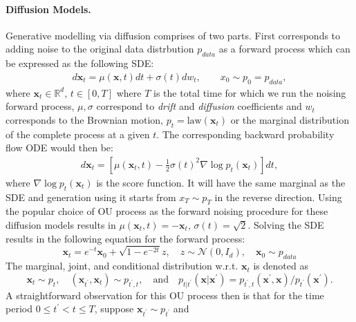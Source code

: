 \documentclass[11pt]{article}
\newcommand{\xh}[1]{\textcolor[HTML]{66CCFF}{#1}}
\def\rvx{{\mathbf{x}}}
\def\vx{{\bm{x}}}
\begin{document}
\paragraph{Diffusion Models.} Generative modelling via diffusion comprises of two parts. First corresponds to adding noise to the original data distrbution $p_{data}$ as a forward process which can be expressed as the following SDE:
\begin{align}
\label{general_sde_eq}
    d\vx_t = \mu(\vx,t) dt + \sigma(t)dw_t, \qquad x_0 \sim p_0 = p_{data} ,
\end{align}
where $\vx_t \in \mathbb{R}^d$, $t \in [0,T]$ where $T$ is the total time for which we run the noising forward process, $\mu, \sigma$ correspond to \textit{drift} and \textit{diffusion} coefficients and $w_t$ corresponds to the Brownian motion, $p_t= \text{law}(\vx_t)$ or the marginal distribution of the complete process at a given $t$. 
The corresponding backward probability flow ODE \cite{song2020score} would then be:
\begin{align}
\label{general_rode_eq}
    d\vx_t = \left[\mu(\vx_t,t) - \frac{1}{2}\sigma(t)^2\nabla\log p_t(\vx_t)\right]dt ,
\end{align}
where $\nabla \log p_t(\vx_t)$ is the score function.
It will have the same marginal as the SDE \cite{song2020score} and generation using it starts from $x_T \sim p_T$ in the reverse direction. Using the popular choice of OU process as the forward noising procedure for these diffusion models results in $\mu(\vx_t,t) = -\vx_t$, $\sigma(t)=\sqrt{2}$. Solving the SDE results in the following equation for the forward process:
\[
        \rvx_t = e^{-t} \rvx_{0} + \sqrt{1-e^{-2t}} z, \quad
        z \sim \mathcal{N}(0,I_d), \quad \rvx_0 \sim p_{data}
\]  
The marginal, joint, and conditional distribution w.r.t. $\rvx_t$ is denoted as
\begin{equation}
    \label{def:fwd_prob}
    \rvx_t\sim p_t,\quad (\rvx_{t^\prime}, \rvx_t)\sim p_{t^\prime, t},\quad \text{and}\quad p_{t|t^\prime}(\vx|\vx^\prime) = p_{t^\prime, t}(\vx^\prime, \vx)/p_{t^\prime}(\vx^\prime).
\end{equation}
A straightforward observation for this OU process then is that for the time period $0\le t^\prime < t\le T$, suppose $\rvx_{t^\prime}\sim p_{t^\prime}$ and 
\end{document}
